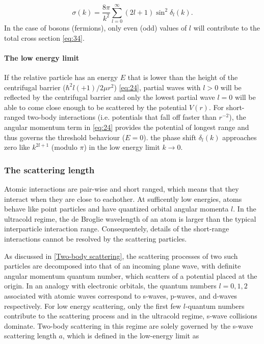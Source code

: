 \documentclass{article}
\numberwithin{equation}{section}
\begin{document}
\begin{equation}\label{eq:34}
\sigma(k)=
\frac{8\pi}{k^2}\sum_{l=0}^{\infty} (2l+1)\sin^2\delta_l(k). 
\end{equation}
In the case of bosons (fermions), only even (odd) values of $l$ will contribute to the total cross section \eqref{eq:34}.

\paragraph{The low energy limit}
If the relative particle has an energy $E$ that is lower than the height of the centrifugal barrier ($\hbar^2l(+1)/2\mu r^2$) \eqref{eq:24}, partial waves with $l>0$ will be reflected by the centrifugal barrier and only the lowest partial wave $l=0$ will be able to come close enough to be scattered by the potential $V(r)$. For short-ranged two-body interactions (i.e. potentials that fall off faster than $r^{-2}$), the angular momentum term in \eqref{eq:24} provides the potential of longest range and thus governs the threshold behaviour ($E=0$). the phase shift $\delta_l(k)$ approaches zero like $k^{2l+1}$ (modulo $\pi$) in the low energy limit $k \rightarrow 0$. 

\subsubsection{The scattering length}
Atomic interactions are pair-wise and short ranged, which means that they interact when they are close to eachother. At sufficently low energies, atoms behave like point particles and have quantized orbital angular momenta $l$.  In the ultracold regime, the de Broglie wavelength of an atom is larger than the typical interparticle interaction range. Consequentely, details of the short-range interactions cannot be resolved by the scattering particles.

As discussed in \cref{Two-body scattering}, the scattering processes of two such particles are decomposed into that of an incoming plane wave, with definite angular momentum quantum number, which scatters of a potential placed at the origin. In an analogy with electronic orbitals, the quantum numbers $l=0,1,2$ associated with atomic waves correspond to s-waves, p-waves, and d-waves respectively. For low energy scattering, only the first few $l$-quantum numbers contribute to the scattering process and in the ultracold regime, s-wave collisions dominate. Two-body scattering in this regime are solely governed by the s-wave scattering length $a$, which is defined in the low-energy limit as
\end{document}
